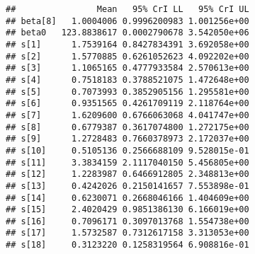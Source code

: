 \documentclass[]{article}
\newenvironment{Shaded}{\begin{snugshade}}{\end{snugshade}}
\newcommand{\CommentTok}[1]{\textcolor[rgb]{0.56,0.35,0.01}{\textit{#1}}}
\newcommand{\ControlFlowTok}[1]{\textcolor[rgb]{0.13,0.29,0.53}{\textbf{#1}}}
\newcommand{\DataTypeTok}[1]{\textcolor[rgb]{0.13,0.29,0.53}{#1}}
\newcommand{\DecValTok}[1]{\textcolor[rgb]{0.00,0.00,0.81}{#1}}
\newcommand{\FloatTok}[1]{\textcolor[rgb]{0.00,0.00,0.81}{#1}}
\newcommand{\KeywordTok}[1]{\textcolor[rgb]{0.13,0.29,0.53}{\textbf{#1}}}
\newcommand{\NormalTok}[1]{#1}
\newcommand{\OperatorTok}[1]{\textcolor[rgb]{0.81,0.36,0.00}{\textbf{#1}}}
\newcommand{\StringTok}[1]{\textcolor[rgb]{0.31,0.60,0.02}{#1}}
\begin{document}
\begin{Shaded}
\end{Shaded}

\begin{verbatim}
##                Mean   95% CrI LL   95% CrI UL
## beta[8]   1.0004006 0.9996200983 1.001256e+00
## beta0   123.8838617 0.0002790678 3.542050e+06
## s[1]      1.7539164 0.8427834391 3.692058e+00
## s[2]      1.5770885 0.6261052623 4.092202e+00
## s[3]      1.1065165 0.4777933584 2.570613e+00
## s[4]      0.7518183 0.3788521075 1.472648e+00
## s[5]      0.7073993 0.3852905156 1.295581e+00
## s[6]      0.9351565 0.4261709119 2.118764e+00
## s[7]      1.6209600 0.6766063068 4.041747e+00
## s[8]      0.6779387 0.3617074800 1.272175e+00
## s[9]      1.2728483 0.7660378973 2.172037e+00
## s[10]     0.5105136 0.2566688109 9.528015e-01
## s[11]     3.3834159 2.1117040150 5.456805e+00
## s[12]     1.2283987 0.6466912805 2.348813e+00
## s[13]     0.4242026 0.2150141657 7.553898e-01
## s[14]     0.6230071 0.2668046166 1.404609e+00
## s[15]     2.4020429 0.9851386130 6.166019e+00
## s[16]     0.7096171 0.3097013768 1.554738e+00
## s[17]     1.5732587 0.7312617158 3.313053e+00
## s[18]     0.3123220 0.1258319564 6.908816e-01
\end{verbatim}
\end{document}
